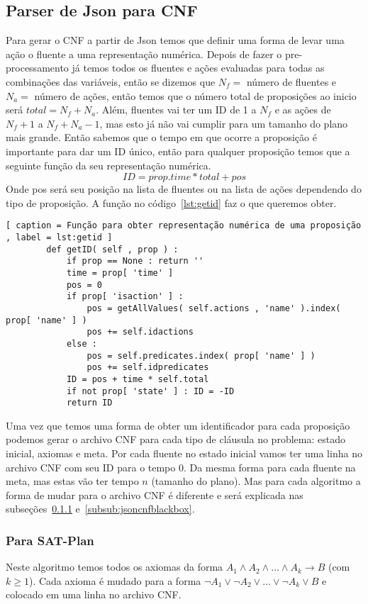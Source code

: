  \subsection{Parser de Json para CNF}
 \label{subsec:jsoncnf}
 	Para gerar o CNF a partir de Json temos que definir uma forma de levar uma ação o fluente a uma representação numérica. Depois de fazer o pre-processamento já temos todos os fluentes e ações evaluadas para todas as combinações das variáveis, então se dizemos que $N_f = $ número de fluentes e $N_a = $ número de ações, então temos que o número total de proposições ao inicio será $total = N_f + N_a$. Além, fluentes vai ter um ID de 1 a $N_f$ e as ações de $N_f + 1$ a $N_f + N_a - 1$, mas esto já não vai cumplir para um tamanho do plano mais grande. Então sabemos que o tempo em que ocorre a proposição é importante para dar um ID único, então para qualquer proposição temos que a seguinte função da seu representação numérica.
	\[
		ID = prop.time * total + pos
	\]
	Onde pos será seu posição na lista de fluentes ou na lista de ações dependendo do tipo de proposição. A função no código~\ref{lst:getid} faz o que queremos obter.
	\begin{lstlisting}[ caption = Função para obter representação numérica de uma proposição , label = lst:getid ]
		def getID( self , prop ) :
			if prop == None : return ''
			time = prop[ 'time' ]
			pos = 0
			if prop[ 'isaction' ] :
				pos = getAllValues( self.actions , 'name' ).index( prop[ 'name' ] )
				pos += self.idactions
			else :
				pos = self.predicates.index( prop[ 'name' ] )
				pos += self.idpredicates
			ID = pos + time * self.total
			if not prop[ 'state' ] : ID = -ID
			return ID
	\end{lstlisting}
	Uma vez que temos uma forma de obter um identificador para cada proposição podemos gerar o archivo CNF para cada tipo de cláusula no problema: estado inicial, axiomas e meta.
	Por cada fluente no estado inicial vamos ter uma linha no archivo CNF com seu ID para o tempo 0. Da mesma forma para cada fluente na meta, mas estas vão ter tempo $n$ (tamanho do plano). Mas para cada algoritmo a forma de mudar para o archivo CNF é diferente e será explicada nas subseções~\ref{subsub:jsoncnfsatplan} e~\ref{subsub:jsoncnfblackbox}.
 	
 	\subsubsection{Para SAT-Plan}
	\label{subsub:jsoncnfsatplan}
		Neste algoritmo temos todos os axiomas da forma $A_1 \land A_2 \land \ldots \land A_k \to B$ (com $k \geq 1$). Cada axioma é mudado para a forma $\lnot A_1 \lor \lnot A_2 \lor \ldots \lor \lnot A_k \lor B$ e colocado em uma linha no archivo CNF.
		
